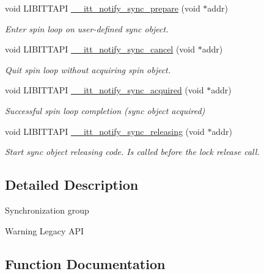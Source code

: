 \begin{DoxyCompactItemize}
\item 
void L\+I\+B\+I\+T\+T\+A\+P\+I \hyperlink{group__legacy__sync_gac02b12fb980d0edc058b280a512f9b4c}{\+\_\+\+\_\+itt\+\_\+notify\+\_\+sync\+\_\+prepare} (void $\ast$addr)
\begin{DoxyCompactList}\small\item\em Enter spin loop on user-\/defined sync object. \end{DoxyCompactList}\item 
void L\+I\+B\+I\+T\+T\+A\+P\+I \hyperlink{group__legacy__sync_gacf148cea40415abcee401dfd43d8a5c1}{\+\_\+\+\_\+itt\+\_\+notify\+\_\+sync\+\_\+cancel} (void $\ast$addr)
\begin{DoxyCompactList}\small\item\em Quit spin loop without acquiring spin object. \end{DoxyCompactList}\item 
void L\+I\+B\+I\+T\+T\+A\+P\+I \hyperlink{group__legacy__sync_gac781d21056c5e4a50ed939eff306e155}{\+\_\+\+\_\+itt\+\_\+notify\+\_\+sync\+\_\+acquired} (void $\ast$addr)
\begin{DoxyCompactList}\small\item\em Successful spin loop completion (sync object acquired) \end{DoxyCompactList}\item 
void L\+I\+B\+I\+T\+T\+A\+P\+I \hyperlink{group__legacy__sync_ga6235d3f0e928b27b3fa2ac8e707f4735}{\+\_\+\+\_\+itt\+\_\+notify\+\_\+sync\+\_\+releasing} (void $\ast$addr)
\begin{DoxyCompactList}\small\item\em Start sync object releasing code. Is called before the lock release call. \end{DoxyCompactList}\end{DoxyCompactItemize}


\subsection{Detailed Description}
Synchronization group \begin{DoxyWarning}{Warning}
Legacy A\+P\+I 
\end{DoxyWarning}


\subsection{Function Documentation}
\hypertarget{group__legacy__sync_gac781d21056c5e4a50ed939eff306e155}{}
